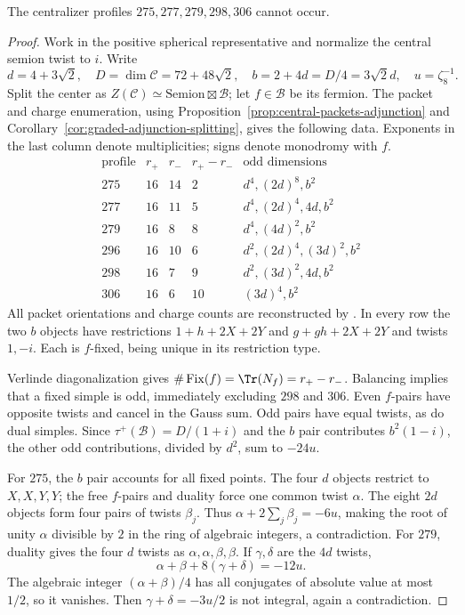 \begin{proposition}
\label{prop:155-centralizer-cuts}
The centralizer profiles $275,277,279,298,306$ cannot occur.
\end{proposition}
\begin{proof}
Work in the positive spherical representative and normalize the central
semion twist to $i$. Write
\[
 d=4+3\sqrt2,\quad D=\dim\mathcal C=72+48\sqrt2,\quad
 b=2+4d=D/4=3\sqrt2d,\quad u=\zeta_8^{-1}.
\]
Split the center as $Z(\mathcal C)\simeq\mathrm{Semion}\boxtimes\mathcal B$;
let $f\in\mathcal B$ be its fermion. The packet and charge enumeration,
using Proposition~\ref{prop:central-packets-adjunction} and
Corollary~\ref{cor:graded-adjunction-splitting}, gives the following data.
Exponents in the last column denote multiplicities; signs denote
monodromy with $f$.
\[
\begin{array}{c|rrr|l}
 \text{profile}&r_+&r_-&r_+-r_-&\text{odd dimensions}\\\hline
 275&16&14&2 &d^4,(2d)^8,b^2\\
 277&16&11&5 &d^4,(2d)^4,4d,b^2\\
 279&16&8 &8 &d^4,(4d)^2,b^2\\
 296&16&10&6 &d^2,(2d)^4,(3d)^2,b^2\\
 298&16&7 &9 &d^2,(3d)^2,4d,b^2\\
 306&16&6 &10&(3d)^4,b^2
\end{array}
\]
All packet orientations and charge counts are reconstructed by
. In every row the two $b$ objects
have restrictions $1+h+2X+2Y$ and $g+gh+2X+2Y$ and twists $1,-i$.
Each is $f$-fixed, being unique in its restriction type.

Verlinde diagonalization gives
$\#\operatorname{Fix}(f)=\Tr(N_f)=r_+-r_-$. Balancing implies that a
fixed simple is odd, immediately excluding $298$ and $306$.
Even $f$-pairs have opposite twists and cancel in the Gauss sum.
Odd pairs have equal twists, as do dual simples. Since
$\tau^+(\mathcal B)=D/(1+i)$ and the $b$ pair contributes $b^2(1-i)$,
the other odd contributions, divided by $d^2$, sum to $-24u$.

For $275$, the $b$ pair accounts for all fixed points. The four
$d$ objects restrict to $X,X,Y,Y$; the free $f$-pairs and duality force
one common twist $\alpha$. The eight $2d$ objects form four pairs of
twists $\beta_j$. Thus
$\alpha+2\sum_j\beta_j=-6u$, making the root of unity $\alpha$ divisible
by $2$ in the ring of algebraic integers, a contradiction.
For $279$, duality gives the four $d$ twists as
$\alpha,\alpha,\beta,\beta$. If $\gamma,\delta$ are the $4d$ twists,
\[
 \alpha+\beta+8(\gamma+\delta)=-12u.
\]
The algebraic integer $(\alpha+\beta)/4$ has all conjugates of absolute
value at most $1/2$, so it vanishes. Then
$\gamma+\delta=-3u/2$ is not integral, again a contradiction.


\end{proof}
